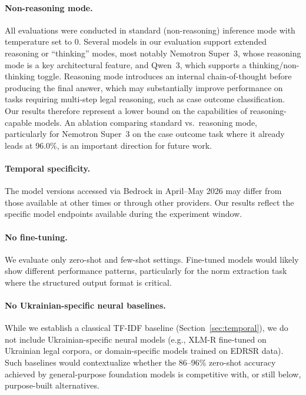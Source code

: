 \documentclass[11pt,a4paper]{article}
\begin{document}
\paragraph{Non-reasoning mode.} All evaluations were conducted in standard (non-reasoning) inference mode with temperature set to 0. Several models in our evaluation support extended reasoning or ``thinking'' modes, most notably Nemotron Super~3, whose reasoning mode is a key architectural feature, and Qwen~3, which supports a thinking/non-thinking toggle. Reasoning mode introduces an internal chain-of-thought before producing the final answer, which may substantially improve performance on tasks requiring multi-step legal reasoning, such as case outcome classification. Our results therefore represent a lower bound on the capabilities of reasoning-capable models. An ablation comparing standard vs.\ reasoning mode, particularly for Nemotron Super~3 on the case outcome task where it already leads at 96.0\%, is an important direction for future work.

\paragraph{Temporal specificity.} The model versions accessed via Bedrock in April--May 2026 may differ from those available at other times or through other providers. Our results reflect the specific model endpoints available during the experiment window.

\paragraph{No fine-tuning.} We evaluate only zero-shot and few-shot settings. Fine-tuned models would likely show different performance patterns, particularly for the norm extraction task where the structured output format is critical.

\paragraph{No Ukrainian-specific neural baselines.} While we establish a classical TF-IDF baseline (Section~\ref{sec:temporal}), we do not include Ukrainian-specific neural models (e.g., XLM-R fine-tuned on Ukrainian legal corpora, or domain-specific models trained on EDRSR data). Such baselines would contextualize whether the 86--96\% zero-shot accuracy achieved by general-purpose foundation models is competitive with, or still below, purpose-built alternatives.
\end{document}
